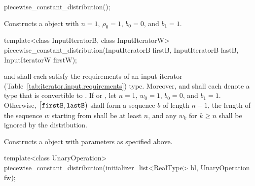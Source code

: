 %
\begin{itemdecl}
piecewise_constant_distribution();
\end{itemdecl}

\begin{itemdescr}
\pnum\effects Constructs a  object
 with $ n = 1 $,
 $\rho_0 = 1 $,
 $ b_0 = 0 $,
 and $ b_1 = 1 $.
\end{itemdescr}


%
\begin{itemdecl}
template<class InputIteratorB, class InputIteratorW>
 piecewise_constant_distribution(InputIteratorB firstB, InputIteratorB lastB,
                                 InputIteratorW firstW);
\end{itemdecl}

\begin{itemdescr}
\pnum\requires
   and 
  shall each satisfy the requirements
  of an input iterator (Table~\ref{tab:iterator.input.requirements}) type.
  Moreover,
   and
  shall each denote a type that is convertible to .
 If 
 or ,
 let $ n = 1 $,
     $ w_0 = 1 $,
     $ b_0 = 0 $,
 and $ b_1 = 1 $.
 Otherwise,
 $\bigl[\texttt{\protect firstB}, \texttt{\protect lastB}\bigr)$
 shall form a sequence $b$ of length $n+1$,
 the length of the sequence $w$ starting from 
 shall be at least $n$,
 and any $w_k$ for  $k \geq n$ shall be ignored by the distribution.

\pnum\effects Constructs a  object
 with parameters as specified above.
\end{itemdescr}


%
\begin{itemdecl}
template<class UnaryOperation>
 piecewise_constant_distribution(initializer_list<RealType> bl, UnaryOperation fw);
\end{itemdecl}

